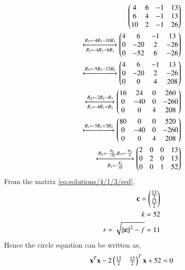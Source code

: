 \begin{align}
    \begin{pmatrix}4&6&-1&13\\6&4&-1&13\\10&2&-1&26\end{pmatrix}\\
    \xleftrightarrow[R_2\leftarrow4R_2-6R_1]{R_3\leftarrow 4R_3-10R_1}
    \begin{pmatrix}4&6&-1&13\\0&-20&2&-26\\0&-52&6&-26\end{pmatrix}\\
    \xleftrightarrow[]{R_3\leftarrow 5R_3-13R_2}
    \begin{pmatrix}4&6&-1&13\\0&-20&2&-26\\0&0&4&208\end{pmatrix}\\
    \xleftrightarrow[R_1\leftarrow 4R_1+R_3]{R_2\leftarrow 2R_2-R_3}
   \begin{pmatrix}16&24&0&260\\0&-40&0&-260\\0&0&4&208\end{pmatrix}\\
   \xleftrightarrow[]{R_1\leftarrow 5R_1+3R_2}
   \begin{pmatrix}80&0&0&520\\0&-40&0&-260\\0&0&4&208\end{pmatrix}\\
   \label{eq:solutions/4/1/3/red}
   \xleftrightarrow[R_1\leftarrow \frac{R_1}{40}]{R_2\leftarrow\frac{R_2}{-20},R_3\leftarrow\frac{R_3}{4}}
   \begin{pmatrix}2&0&0&13\\0&2&0&13\\0&0&1&52\end{pmatrix}
\end{align}
From the matrix \eqref{eq:solutions/4/1/3/red},
\begin{align}
    \mathbf{c}=\begin{pmatrix}\frac{13}{2}\\\frac{13}{2}\end{pmatrix}\\
    k=52\\
    r=\sqrt{\left\lVert\mathbf{c}\right\rVert^2-f}=11
\end{align}
Hence the circle equation can be written as,
\begin{align}
    \mathbf{x}^T\mathbf{x}-2\begin{pmatrix}\frac{13}{2}&\frac{13}{2}\end{pmatrix}^T\mathbf{x}+52=0
\end{align}
